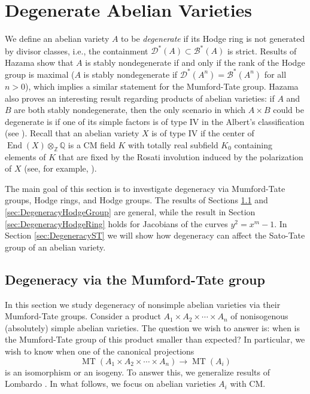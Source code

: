 \documentclass[reqno, oneside, 12pt]{amsart}
\DeclareMathOperator{\End}{End}
\DeclareMathOperator{\MT}{MT}
\newcommand{\Z}{\mathbb{Z}}
\newcommand{\Q}{\mathbb{Q}}
\theoremstyle{remark}
\numberwithin{equation}{section}
\begin{document}
\section{Degenerate Abelian Varieties}\label{sec:Degeneracy}

We  define an abelian variety $A$ to be \emph{degenerate} if its Hodge ring is not generated by divisor classes, i.e., the containment  $\mathscr D^*(A) \subset \mathscr B^*(A)$ is strict. Results of Hazama \cite{Hazama89} show that $A$ is stably nondegenerate if and only if the rank of the Hodge group is maximal ($A$ is stably nondegenerate if $\mathscr D^*(A^n) = \mathscr B^*(A^n)$ for all $n>0$), which implies a similar statement for the Mumford-Tate group. Hazama also proves an interesting result regarding products of abelian varieties: if $A$ and $B$ are both stably nondegenerate, then the only scenario in which $A\times B$ could be degenerate is if one of its simple factors is of type IV in the Albert's classification (see  \cite{Hazama89}). Recall that an abelian variety $X$ is of type IV if the center of $\End(X)\otimes_\Z \Q$ is a CM field $K$ with totally real subfield $K_0$ containing elements of $K$ that are fixed by the Rosati involution induced by the polarization of $X$ (see, for example, \cite[Section 21]{Mumford69}).

The main goal of this section is to investigate degeneracy via Mumford-Tate groups, Hodge rings, and Hodge groups. The results of Sections \ref{sec:DegneracyMT} and \ref{sec:DegeneracyHodgeGroup} are general, while the result in Section \ref{sec:DegeneracyHodgeRing} holds for Jacobians of the curves $y^2=x^m-1$. In Section \ref{sec:DegeneracyST} we will show how degeneracy can affect the Sato-Tate group of an abelian variety.


\subsection{Degeneracy via the Mumford-Tate group}\label{sec:DegneracyMT}

In this section we study degeneracy of nonsimple abelian varieties via their Mumford-Tate groups. Consider a product  $A_1\times A_2\times \cdots \times  A_n$ of nonisogenous (absolutely) simple abelian varieties. The question we wish to answer is: when is the Mumford-Tate group of this product smaller than expected? In particular, we wish to know when one of the canonical projections
$$\MT(A_1\times A_2\times \cdots \times  A_n)\longrightarrow \MT(A_i)$$
is an isomorphism or an isogeny. To answer this, we generalize results of Lombardo \cite{Lombardo2021}. In what follows, we focus on abelian varieties $A_i$ with CM.
\end{document}
